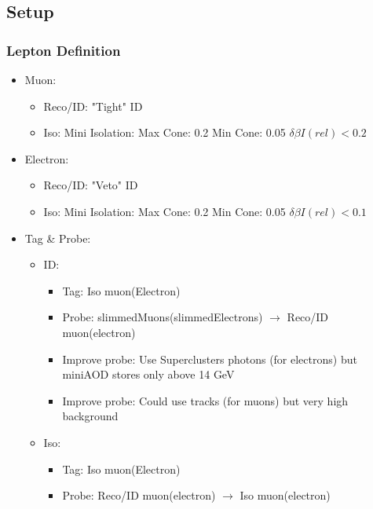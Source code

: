 \documentclass{beamer}
\begin{document}
\subsection{Setup}
\begin{frame}
\frametitle{Lepton Definition}
\begin{itemize}
 \item Muon:
 \begin{itemize}
  \item Reco/ID: "Tight" ID
  \item Iso: Mini Isolation: Max Cone: 0.2 Min Cone: 0.05 $\delta \beta I(rel)<0.2$
 \end{itemize}
  \item Electron:
 \begin{itemize}
  \item Reco/ID: "Veto" ID
  \item Iso: Mini Isolation: Max Cone: 0.2 Min Cone: 0.05 $\delta \beta I(rel)<0.1$
 \end{itemize}
 \item Tag \& Probe:
 \begin{itemize}
 \item ID:
 \begin{itemize}
  \item Tag: Iso muon(Electron)
  \item Probe: slimmedMuons(slimmedElectrons) $\rightarrow$ Reco/ID muon(electron)
  \item Improve probe: Use Superclusters photons (for electrons) but miniAOD stores only above  14 GeV
  \item Improve probe: Could use tracks (for muons) but very high background
 \end{itemize}
  \item Iso:
 \begin{itemize}
  \item Tag: Iso muon(Electron)
  \item Probe: Reco/ID muon(electron) $\rightarrow$ Iso muon(electron)
  
 \end{itemize}

 \end{itemize}
\end{itemize}
\end{frame}
\end{document}
